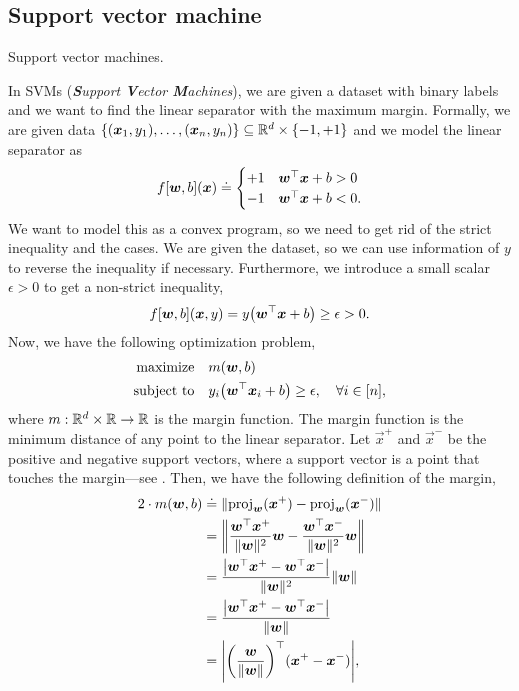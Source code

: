 \subsection{Support vector machine}

\begin{marginfigure}[7cm]
    \centering
    \caption{Support vector machines.}
    \label{fig:svm}
\end{marginfigure}

In SVMs (\textit{\textbf{S}upport \textbf{V}ector \textbf{M}achines}), we are given a dataset with
binary labels and we want to find the linear separator with the maximum margin. Formally, we are
given data $\{ (\bm{x}_1, y_1), \ldots, (\bm{x}_n, y_n) \} \subseteq \mathbb{R}^d \times \{ -1, +1 \}$
and we model the linear separator as \[
    f[\bm{w}, b](\bm{x}) \doteq
    \begin{cases}
        +1 & \bm{w}^\top \bm{x} + b > 0  \\
        -1 & \bm{w}^\top \bm{x} + b < 0.
    \end{cases}
\]
We want to model this as a convex program, so we need to get rid of the strict inequality and the
cases. We are given the dataset, so we can use information of $y$ to reverse the inequality if
necessary. Furthermore, we introduce a small scalar $\epsilon > 0$ to get a non-strict inequality, \[
    f[\vec{w}, b](\vec{x}, y) = y \lft( \transpose{\vec{w}} \vec{x} + b \rgt) \geq \epsilon > 0.
\]
Now, we have the following optimization problem,
\begin{align*}
    \text{maximize}   & \quad m(\vec{w}, b)                                                                             \\
    \text{subject to} & \quad y_i \lft( \transpose{\vec{w}} \vec{x}_i + b \rgt) \geq \epsilon, \quad \forall i \in [n],
\end{align*}
where $m: \mathbb{R}^d \times \mathbb{R} \to \mathbb{R}$ is the margin function. The margin function is the minimum distance
of any point to the linear separator. Let $\vec{x}^+$ and $\vec{x}^-$ be the positive and negative
support vectors, where a support vector is a point that touches the margin---see . Then, we have the following definition of the margin,
\begin{align*}
    2 \cdot m(\vec{w}, b) & \doteq \| \mathrm{proj}_{\vec{w}}(\vec{x}^+) - \mathrm{proj}_{\vec{w}}(\vec{x}^-) \|                                                          \\
                          & = \lft\| \frac{\transpose{\vec{w}} \vec{x}^+}{\| \vec{w} \|^2} \vec{w} - \frac{\transpose{\vec{w}} \vec{x}^-}{\| \vec{w} \|^2} \vec{w} \rgt\| \\
                          & = \frac{\lft| \transpose{\vec{w}} \vec{x}^+ - \transpose{\vec{w}} \vec{x}^- \rgt|}{\| \vec{w} \|^2} \| \vec{w} \|                             \\
                          & = \frac{\lft| \transpose{\vec{w}} \vec{x}^+ - \transpose{\vec{w}} \vec{x}^- \rgt|}{\| \vec{w} \|}                                             \\
                          & = \lft| \transpose{\lft( \frac{\vec{w}}{\| \vec{w} \|} \rgt)} (\vec{x}^+ - \vec{x}^-) \rgt|,
\end{align*}
